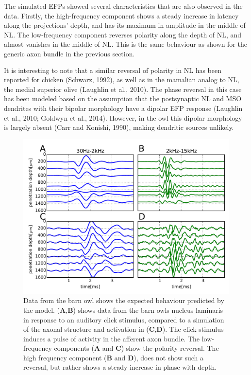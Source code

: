 \documentclass[]{article}
\begin{document}
The simulated EFPs showed several characteristics that are also observed
in the data. Firstly, the high-frequency component shows a steady
increase in latency along the projections' depth, and has its maximum in
amplitude in the middle of NL. The low-frequency component reverses
polarity along the depth of NL, and almost vanishes in the middle of NL.
This is the same behaviour as shown for the generic axon bundle in the
previous section.

It is interesting to note that a similar reversal of polarity in NL has
been reported for chicken (Schwarz, 1992), as well as in the mamalian
analog to NL, the medial superior olive (Laughlin et al., 2010). The
phase reversal in this case has been modeled based on the assumption
that the postsynaptic NL and MSO dendrites with their bipolar morphology
have a dipolar EFP response (Laughlin et al., 2010; Goldwyn et al.,
2014). However, in the owl this dipolar morphology is largely absent
(Carr and Konishi, 1990), making dendritic sources unlikely.

\begin{figure}[htbp]
\centering
\includegraphics{../figs/fig_3.pdf}
\caption{Data from the barn owl shows the expected behaviour predicted
by the model. (\textbf{A},\textbf{B}) shows data from the barn owls
nucleus laminaris in response to an auditory click stimulus, compared to
a simulation of the axonal structure and activation in
(\textbf{C},\textbf{D}). The click stimulus induces a pulse of activity
in the afferent axon bundle. The low-frequency components (\textbf{A}
and \textbf{C}) show the polarity reversal. The high frequency component
(\textbf{B} and \textbf{D}), does not show such a reversal, but rather
shows a steady increase in phase with depth.}
\end{figure}
\end{document}
